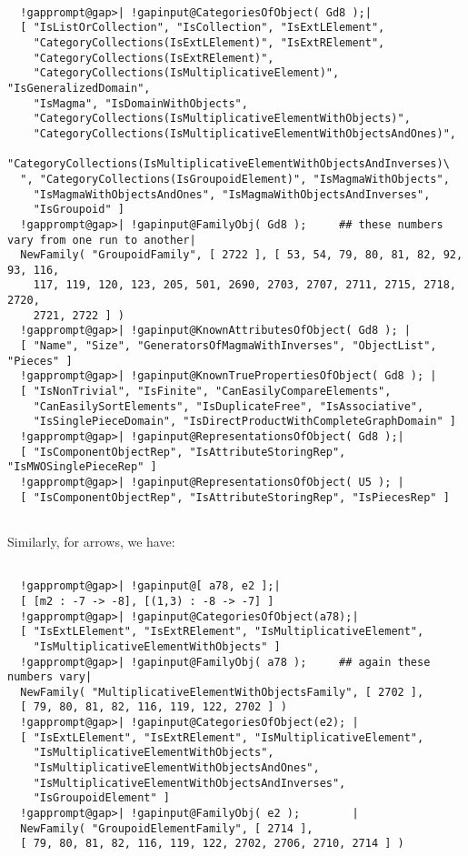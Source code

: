 \documentclass[a4paper,11pt]{report}
\begin{document}
{{ 
\begin{Verbatim}[commandchars=!@|,fontsize=\small,frame=single,label=Example]
  
  !gapprompt@gap>| !gapinput@CategoriesOfObject( Gd8 );|
  [ "IsListOrCollection", "IsCollection", "IsExtLElement", 
    "CategoryCollections(IsExtLElement)", "IsExtRElement", 
    "CategoryCollections(IsExtRElement)", 
    "CategoryCollections(IsMultiplicativeElement)", "IsGeneralizedDomain", 
    "IsMagma", "IsDomainWithObjects", 
    "CategoryCollections(IsMultiplicativeElementWithObjects)", 
    "CategoryCollections(IsMultiplicativeElementWithObjectsAndOnes)", 
    "CategoryCollections(IsMultiplicativeElementWithObjectsAndInverses)\
  ", "CategoryCollections(IsGroupoidElement)", "IsMagmaWithObjects", 
    "IsMagmaWithObjectsAndOnes", "IsMagmaWithObjectsAndInverses", 
    "IsGroupoid" ]
  !gapprompt@gap>| !gapinput@FamilyObj( Gd8 );     ## these numbers vary from one run to another|
  NewFamily( "GroupoidFamily", [ 2722 ], [ 53, 54, 79, 80, 81, 82, 92, 93, 116, 
    117, 119, 120, 123, 205, 501, 2690, 2703, 2707, 2711, 2715, 2718, 2720, 
    2721, 2722 ] )
  !gapprompt@gap>| !gapinput@KnownAttributesOfObject( Gd8 ); |
  [ "Name", "Size", "GeneratorsOfMagmaWithInverses", "ObjectList", "Pieces" ]
  !gapprompt@gap>| !gapinput@KnownTruePropertiesOfObject( Gd8 ); |
  [ "IsNonTrivial", "IsFinite", "CanEasilyCompareElements", 
    "CanEasilySortElements", "IsDuplicateFree", "IsAssociative", 
    "IsSinglePieceDomain", "IsDirectProductWithCompleteGraphDomain" ]
  !gapprompt@gap>| !gapinput@RepresentationsOfObject( Gd8 );|
  [ "IsComponentObjectRep", "IsAttributeStoringRep", "IsMWOSinglePieceRep" ]
  !gapprompt@gap>| !gapinput@RepresentationsOfObject( U5 ); |
  [ "IsComponentObjectRep", "IsAttributeStoringRep", "IsPiecesRep" ]
  
\end{Verbatim}
 Similarly, for arrows, we have: 

 
\begin{Verbatim}[commandchars=!@|,fontsize=\small,frame=single,label=Example]
  
  !gapprompt@gap>| !gapinput@[ a78, e2 ];|
  [ [m2 : -7 -> -8], [(1,3) : -8 -> -7] ]
  !gapprompt@gap>| !gapinput@CategoriesOfObject(a78);|
  [ "IsExtLElement", "IsExtRElement", "IsMultiplicativeElement", 
    "IsMultiplicativeElementWithObjects" ]
  !gapprompt@gap>| !gapinput@FamilyObj( a78 );     ## again these numbers vary|
  NewFamily( "MultiplicativeElementWithObjectsFamily", [ 2702 ], 
  [ 79, 80, 81, 82, 116, 119, 122, 2702 ] )
  !gapprompt@gap>| !gapinput@CategoriesOfObject(e2); |
  [ "IsExtLElement", "IsExtRElement", "IsMultiplicativeElement", 
    "IsMultiplicativeElementWithObjects", 
    "IsMultiplicativeElementWithObjectsAndOnes", 
    "IsMultiplicativeElementWithObjectsAndInverses", 
    "IsGroupoidElement" ]
  !gapprompt@gap>| !gapinput@FamilyObj( e2 );        |
  NewFamily( "GroupoidElementFamily", [ 2714 ], 
  [ 79, 80, 81, 82, 116, 119, 122, 2702, 2706, 2710, 2714 ] )
  

\end{Verbatim}}}
\end{document}
